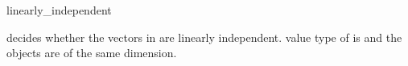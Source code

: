 \ccHtmlNoRefLinks
\begin{ccRefFunction}{linearly_independent}
\ccHtmlNoLinks

{decides whether the vectors in \ccc{A = tuple [first,last)} are linearly
 independent.  \ccPrecond value type of  is
  and the objects are of the same dimension.}

\end{ccRefFunction}

